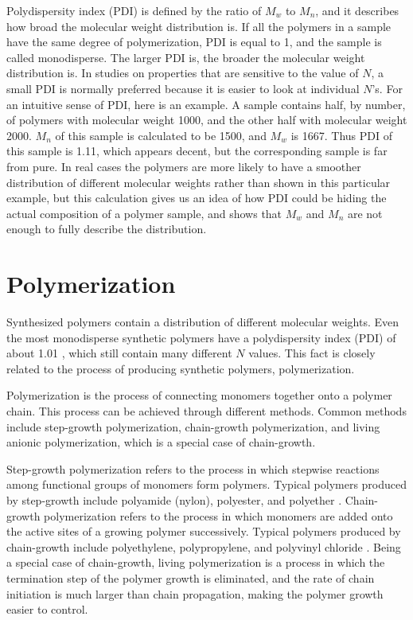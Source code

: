Polydispersity index (PDI) is defined by the ratio of $M_{w}$ to $M_{n}$, and it describes how broad the molecular weight distribution is. If all the polymers in a sample have the same degree of polymerization, PDI is equal to 1, and the sample is called monodisperse. The larger PDI is, the broader the molecular weight distribution is. In studies on properties that are sensitive to the value of $N$, a small PDI is normally preferred because it is easier to look at individual $N$'s. For an intuitive sense of PDI, here is an example. A sample contains half, by number, of polymers with molecular weight 1000, and the other half with molecular weight 2000. $M_{n}$ of this sample is calculated to be 1500, and $M_{w}$ is 1667. Thus PDI of this sample is 1.11, which appears decent, but the corresponding sample is far from pure. In real cases the polymers are more likely to have a smoother distribution of different molecular weights rather than shown in this particular example, but this calculation gives us an idea of how PDI could be hiding the actual composition of a polymer sample, and shows that $M_{w}$ and $M_{n}$ are not enough to fully describe the distribution.

\section{Polymerization}

Synthesized polymers contain a distribution of different molecular weights. Even the most monodisperse synthetic polymers have a polydispersity index (PDI) of about 1.01 \cite{Thakur2016}, which still contain many different $N$ values. This fact is closely related to the process of producing synthetic polymers, polymerization.

Polymerization is the process of connecting monomers together onto a polymer chain. This process can be achieved through different methods. Common methods include step-growth polymerization, chain-growth polymerization, and living anionic polymerization, which is a special case of chain-growth. 

Step-growth polymerization refers to the process in which stepwise reactions among functional groups of monomers form polymers. Typical polymers produced by step-growth include polyamide (nylon), polyester, and polyether \cite{Carraher2003}. Chain-growth polymerization refers to the process in which monomers are added onto the active sites of a growing polymer successively. Typical polymers produced by chain-growth include polyethylene, polypropylene, and polyvinyl chloride \cite{YOUNG2017}. Being a special case of chain-growth, living polymerization is a process in which the termination step of the polymer growth is eliminated, and the rate of chain initiation is much larger than chain propagation, making the polymer growth easier to control.

